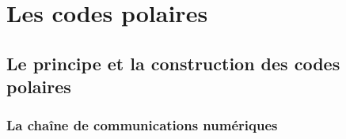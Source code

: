 
\chapter{Les codes polaires}

\vspace*{\fill}
\minitocTITI
\vspace*{\fill}


\section{Le principe et la construction des codes polaires}

\subsection{La chaîne de communications numériques}
\label{subsec:contexte}



